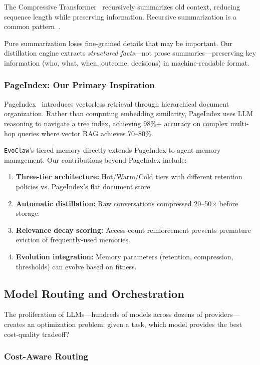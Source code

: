 \documentclass{article}
\newcommand{\evoclaw}{\texttt{EvoClaw}\xspace}
\begin{document}
The Compressive Transformer~\cite{rae2019compressive} recursively summarizes old context, reducing sequence length while preserving information. Recursive summarization is a common pattern~\cite{wu2023scaling}.

Pure summarization loses fine-grained details that may be important. Our distillation engine extracts \textit{structured facts}—not prose summaries—preserving key information (who, what, when, outcome, decisions) in machine-readable format.

\subsubsection{PageIndex: Our Primary Inspiration}

PageIndex~\cite{vectifyai_pageindex} introduces vectorless retrieval through hierarchical document organization. Rather than computing embedding similarity, PageIndex uses LLM reasoning to navigate a tree index, achieving 98\%+ accuracy on complex multi-hop queries where vector RAG achieves 70--80\%.

\evoclaw{}'s tiered memory directly extends PageIndex to agent memory management. Our contributions beyond PageIndex include:

\begin{enumerate}[leftmargin=*]
    \item \textbf{Three-tier architecture:} Hot/Warm/Cold tiers with different retention policies vs. PageIndex's flat document store.
    \item \textbf{Automatic distillation:} Raw conversations compressed 20--50$\times$ before storage.
    \item \textbf{Relevance decay scoring:} Access-count reinforcement prevents premature eviction of frequently-used memories.
    \item \textbf{Evolution integration:} Memory parameters (retention, compression, thresholds) can evolve based on fitness.
\end{enumerate}

\subsection{Model Routing and Orchestration}

The proliferation of LLMs—hundreds of models across dozens of providers—creates an optimization problem: given a task, which model provides the best cost-quality tradeoff?

\subsubsection{Cost-Aware Routing}
\end{document}
